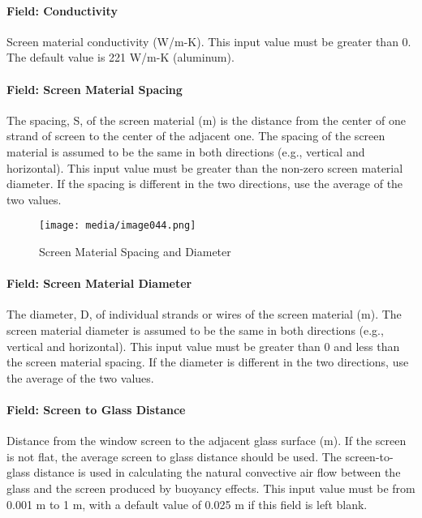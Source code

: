 \paragraph{Field: Conductivity}\label{field-conductivity-5}

Screen material conductivity (W/m-K). This input value must be greater than 0. The default value is 221 W/m-K (aluminum).

\paragraph{Field: Screen Material Spacing}\label{field-screen-material-spacing}

The spacing, S, of the screen material (m) is the distance from the center of one strand of screen to the center of the adjacent one. The spacing of the screen material is assumed to be the same in both directions (e.g., vertical and horizontal). This input value must be greater than the non-zero screen material diameter. If the spacing is different in the two directions, use the average of the two values.

\begin{figure}[hbtp] %
\centering
\texttt{[image: media/image044.png]}
\caption{Screen Material Spacing and Diameter \protect \label{fig:screen-material-spacing-and-diameter}}
\end{figure}

\paragraph{Field: Screen Material Diameter}\label{field-screen-material-diameter}

The diameter, D, of individual strands or wires of the screen material (m). The screen material diameter is assumed to be the same in both directions (e.g., vertical and horizontal). This input value must be greater than 0 and less than the screen material spacing. If the diameter is different in the two directions, use the average of the two values.

\paragraph{Field: Screen to Glass Distance}\label{field-screen-to-glass-distance}

Distance from the window screen to the adjacent glass surface (m). If the screen is not flat, the average screen to glass distance should be used. The screen-to-glass distance is used in calculating the natural convective air flow between the glass and the screen produced by buoyancy effects. This input value must be from 0.001 m to 1 m, with a default value of 0.025 m if this field is left blank.

